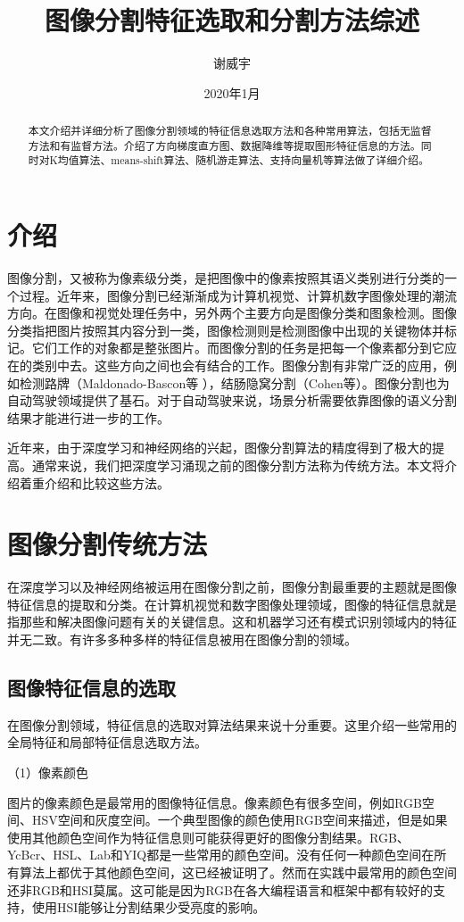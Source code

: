 \documentclass{article}
\title{图像分割特征选取和分割方法综述}
\author{谢威宇 }
\date{2020年1月}
\begin{document}
\maketitle
\begin{abstract}
本文介绍并详细分析了图像分割领域的特征信息选取方法和各种常用算法，包括无监督方法和有监督方法。介绍了方向梯度直方图、数据降维等提取图形特征信息的方法。同时对K均值算法、means-shift算法、随机游走算法、支持向量机等算法做了详细介绍。
\end{abstract}

\section{介绍}
图像分割，又被称为像素级分类，是把图像中的像素按照其语义类别进行分类的一个过程。近年来，图像分割已经渐渐成为计算机视觉、计算机数字图像处理的潮流方向。在图像和视觉处理任务中，另外两个主要方向是图像分类和图象检测。图像分类指把图片按照其内容分到一类，图像检测则是检测图像中出现的关键物体并标记。它们工作的对象都是整张图片。而图像分割的任务是把每一个像素都分到它应在的类别中去。这些方向之间也会有结合的工作。图像分割有非常广泛的应用，例如检测路牌（Maldonado-Bascon等 \cite{4220659}），结肠隐窝分割（Cohen等\cite{COHEN2015150}）。图像分割也为自动驾驶领域提供了基石。对于自动驾驶来说，场景分析需要依靠图像的语义分割结果才能进行进一步的工作。
\newline

近年来，由于深度学习和神经网络的兴起，图像分割算法的精度得到了极大的提高。通常来说，我们把深度学习涌现之前的图像分割方法称为传统方法。本文将介绍着重介绍和比较这些方法。

\section{图像分割传统方法}
在深度学习以及神经网络被运用在图像分割之前，图像分割最重要的主题就是图像特征信息的提取和分类。在计算机视觉和数字图像处理领域，图像的特征信息就是指那些和解决图像问题有关的关键信息。这和机器学习还有模式识别领域内的特征并无二致。有许多多种多样的特征信息被用在图像分割的领域。

\subsection{图像特征信息的选取}
在图像分割领域，特征信息的选取对算法结果来说十分重要。这里介绍一些常用的全局特征和局部特征信息选取方法。

（1）像素颜色

图片的像素颜色是最常用的图像特征信息。像素颜色有很多空间，例如RGB空间、HSV空间和灰度空间。一个典型图像的颜色使用RGB空间来描述，但是如果使用其他颜色空间作为特征信息则可能获得更好的图像分割结果。RGB、 YcBcr、HSL、Lab和YIQ都是一些常用的颜色空间。没有任何一种颜色空间在所有算法上都优于其他颜色空间，这已经被证明了\citep{Color_image_segmentation}。然而在实践中最常用的颜色空间还非RGB和HSI莫属。这可能是因为RGB在各大编程语言和框架中都有较好的支持，使用HSI能够让分割结果少受亮度的影响。
\end{document}
